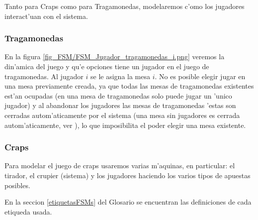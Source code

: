 \newcommand{\ronda}{\italica{FSM Ronda}}
\newcommand{\crupier}{\italica{FSM Crupier}}
\newcommand{\tirador}{\italica{FSM Tirador i}}
\newcommand{\dados}{\italica{FSM Dados i}}
\newcommand{\campo}{\italica{FSM Jugador i haciendo apuesta de Campo }}
\newcommand{\sitio}{\italica{FSM Jugador i haciendo apuesta de sitio}}
\newcommand{\pase}{\italica{FSM Jugador i haciendo apuesta linea de pase / barra No Pase}}
\newcommand{\venir}{\italica{FSM Jugador i haciendo apuesta venir / no venir}}

Tanto para Craps como para Tragamonedas, modelaremos c'omo los jugadores interact'uan con el sistema.

\subsubsection{Tragamonedas}

En la figura \ref{fig_FSM/FSM_Jugador_tragamonedas_i.png} veremos la din'amica del juego y qu'e opciones tiene un jugador en el juego de tragamonedas.
Al jugador $i$ se le asigna la mesa $i$. No es posible elegir jugar en una mesa previamente creada, ya que todas las mesas de tragamonedas existentes est'an ocupadas (en una mesa de tragamonedas solo puede jugar un 'unico jugador) y al abandonar los jugadores las mesas de tragamonedas 'estas son cerradas autom'aticamente por el sistema (una mesa sin jugadores es cerrada autom'aticamente, ver ), lo que imposibilita el poder elegir una mesa existente.

\clearpage


\subsubsection{Craps}
\label{FSM:Craps}
Para modelar el juego de craps usaremos varias m'aquinas, en particular:
el tirador, el crupier (sistema) y los jugadores haciendo los varios tipos de apuestas
posibles. 

En la seccion \ref{etiquetasFSMs} del Glosario se encuentran las definiciones de cada etiqueda usada.

